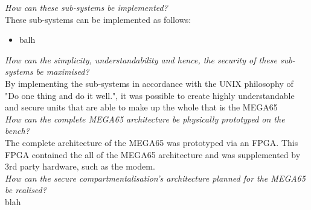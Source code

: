 \textit{How can these sub-systems be implemented?}\\
These sub-systems can be implemented as follows:
\begin{itemize}
\item{balh}
\end{itemize}

\textit{How can the simplicity, understandability and hence, the security of these sub-systems be maximised?}\\
By implementing the sub-systems in accordance with the UNIX philosophy of "Do one thing and do it well.", it was possible to create highly understandable and secure units that are able to make up the whole that is the MEGA65
\\
\textit{How can the complete MEGA65 architecture be physically prototyped on the bench?}\\
The complete architecture of the MEGA65 was prototyped via an FPGA. This FPGA contained the all of the MEGA65 architecture and was supplemented by 3rd party hardware, such as the modem.
\\
\textit{How can the secure compartmentalisation's architecture planned for the MEGA65 be realised?}\\
blah
